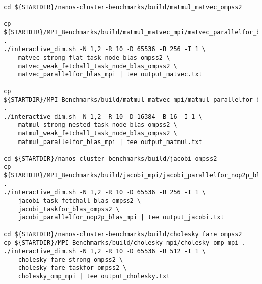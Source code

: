 \documentclass{article}
\begin{document}
\begin{lstlisting}
cd ${STARTDIR}/nanos-cluster-benchmarks/build/matmul_matvec_ompss2

cp ${STARTDIR}/MPI_Benchmarks/build/matmul_matvec_mpi/matvec_parallelfor_blas_mpi .
./interactive_dim.sh -N 1,2 -R 10 -D 65536 -B 256 -I 1 \
	matvec_strong_flat_task_node_blas_ompss2 \
	matvec_weak_fetchall_task_node_blas_ompss2 \
	matvec_parallelfor_blas_mpi | tee output_matvec.txt

cp ${STARTDIR}/MPI_Benchmarks/build/matmul_matvec_mpi/matmul_parallelfor_blas_mpi .
./interactive_dim.sh -N 1,2 -R 10 -D 16384 -B 16 -I 1 \
	matmul_strong_nested_task_node_blas_ompss2 \
	matmul_weak_fetchall_task_node_blas_ompss2 \
	matmul_parallelfor_blas_mpi | tee output_matmul.txt

cd ${STARTDIR}/nanos-cluster-benchmarks/build/jacobi_ompss2
cp ${STARTDIR}/MPI_Benchmarks/build/jacobi_mpi/jacobi_parallelfor_nop2p_blas_mpi .
./interactive_dim.sh -N 1,2 -R 10 -D 65536 -B 256 -I 1 \
	jacobi_task_fetchall_blas_ompss2 \
	jacobi_taskfor_blas_ompss2 \
	jacobi_parallelfor_nop2p_blas_mpi | tee output_jacobi.txt

cd ${STARTDIR}/nanos-cluster-benchmarks/build/cholesky_fare_ompss2
cp ${STARTDIR}/MPI_Benchmarks/build/cholesky_mpi/cholesky_omp_mpi .
./interactive_dim.sh -N 1,2 -R 10 -D 65536 -B 512 -I 1 \
	cholesky_fare_strong_ompss2 \
	cholesky_fare_taskfor_ompss2 \
	cholesky_omp_mpi | tee output_cholesky.txt

\end{lstlisting}
\end{document}
